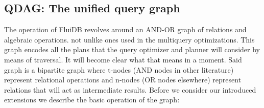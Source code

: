 \subsection{QDAG: The unified query graph}
\label{sec:org5a9ec3b}
The operation of FluiDB revolves around an AND-OR graph of relations
and algebraic operations. not unlike ones used in the multiquery
optimizations. This graph encodes all the plans that the query
optimizer and planner will consider by means of traversal. It will
become clear what that means in a moment. Said graph is a bipartite
graph where t-nodes (AND nodes in other literature) represent
relational operations and n-nodes (OR nodes elsewhere) represent
relations that will act as intermediate results. Before we consider
our introduced extensions we describe the basic operation of the
graph:

